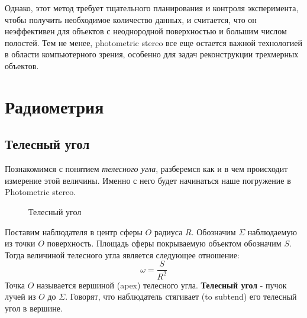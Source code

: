\documentclass[12pt]{article}
\begin{document}
Однако, этот метод требует тщательного планирования и контроля эксперимента,
чтобы получить необходимое количество данных, и считается,
что он неэффективен для объектов с неоднородной поверхностью
и большим числом полостей. Тем не менее, photometric stereo все еще остается
важной технологией в области компьютерного зрения, особенно для задач
реконструкции трехмерных объектов.

\newpage

\section{Радиометрия}
\subsection{Телесный угол}

Познакомимся с понятием \textit{телесного угла}, разберемся как и в чем происходит измерение этой величины. Именно с него будет начинаться наше погружение
в Photometric stereo.

\begin{figure}
  \begin{center}
    \caption{Телесный угол}
  \end{center}
\end{figure}

Поставим наблюдателя в центр сферы $O$ радиуса $R$. Обозначим $\Sigma$ наблюдаемую
из точки $O$ поверхность. Площадь сферы покрываемую объектом обозначим $S$. Тогда величиной телесного угла
является следующее отношение:
$$\omega=\frac{S}{R^2}$$
Точка $O$ называется вершиной (apex) телесного угла.
\textbf{Телесный угол} - пучок лучей из $O$ до $\Sigma$.
Говорят, что наблюдатель стягивает (to subtend) его телесный угол в вершине.
\end{document}
